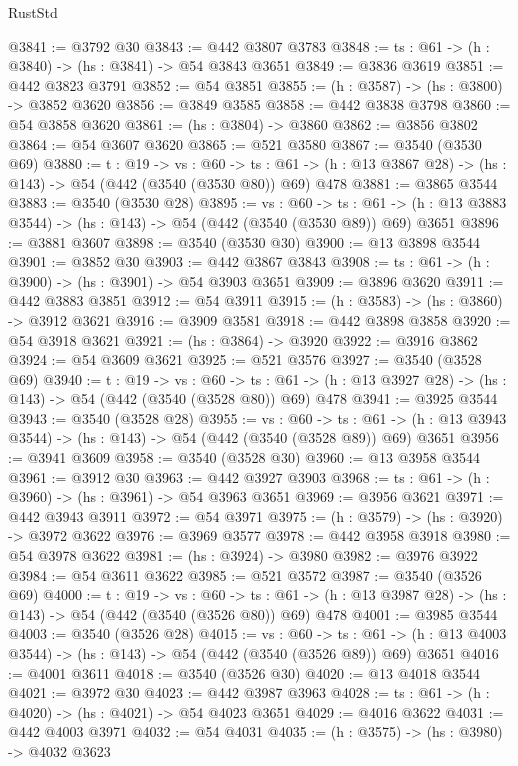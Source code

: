 \begin{lexlean}{RustStd}
\begin{coremodule}
@3841 := @3792 @30
@3843 := @442 @3807 @3783
@3848 := {ts : @61} -> (h : @3840) -> (hs : @3841) -> @54 @3843 @3651
@3849 := @3836 @3619
@3851 := @442 @3823 @3791
@3852 := @54 @3851
@3855 := (h : @3587) -> (hs : @3800) -> @3852 @3620
@3856 := @3849 @3585
@3858 := @442 @3838 @3798
@3860 := @54 @3858 @3620
@3861 := (hs : @3804) -> @3860
@3862 := @3856 @3802
@3864 := @54 @3607 @3620
@3865 := @521 @3580
@3867 := @3540 (@3530 @69)
@3880 := {t : @19} ->
  {vs : @60} ->
  {ts : @61} -> (h : @13 @3867 @28) -> (hs : @143) -> @54 (@442 (@3540 (@3530 @80)) @69) @478
@3881 := @3865 @3544
@3883 := @3540 (@3530 @28)
@3895 := {vs : @60} ->
  {ts : @61} -> (h : @13 @3883 @3544) -> (hs : @143) -> @54 (@442 (@3540 (@3530 @89)) @69) @3651
@3896 := @3881 @3607
@3898 := @3540 (@3530 @30)
@3900 := @13 @3898 @3544
@3901 := @3852 @30
@3903 := @442 @3867 @3843
@3908 := {ts : @61} -> (h : @3900) -> (hs : @3901) -> @54 @3903 @3651
@3909 := @3896 @3620
@3911 := @442 @3883 @3851
@3912 := @54 @3911
@3915 := (h : @3583) -> (hs : @3860) -> @3912 @3621
@3916 := @3909 @3581
@3918 := @442 @3898 @3858
@3920 := @54 @3918 @3621
@3921 := (hs : @3864) -> @3920
@3922 := @3916 @3862
@3924 := @54 @3609 @3621
@3925 := @521 @3576
@3927 := @3540 (@3528 @69)
@3940 := {t : @19} ->
  {vs : @60} ->
  {ts : @61} -> (h : @13 @3927 @28) -> (hs : @143) -> @54 (@442 (@3540 (@3528 @80)) @69) @478
@3941 := @3925 @3544
@3943 := @3540 (@3528 @28)
@3955 := {vs : @60} ->
  {ts : @61} -> (h : @13 @3943 @3544) -> (hs : @143) -> @54 (@442 (@3540 (@3528 @89)) @69) @3651
@3956 := @3941 @3609
@3958 := @3540 (@3528 @30)
@3960 := @13 @3958 @3544
@3961 := @3912 @30
@3963 := @442 @3927 @3903
@3968 := {ts : @61} -> (h : @3960) -> (hs : @3961) -> @54 @3963 @3651
@3969 := @3956 @3621
@3971 := @442 @3943 @3911
@3972 := @54 @3971
@3975 := (h : @3579) -> (hs : @3920) -> @3972 @3622
@3976 := @3969 @3577
@3978 := @442 @3958 @3918
@3980 := @54 @3978 @3622
@3981 := (hs : @3924) -> @3980
@3982 := @3976 @3922
@3984 := @54 @3611 @3622
@3985 := @521 @3572
@3987 := @3540 (@3526 @69)
@4000 := {t : @19} ->
  {vs : @60} ->
  {ts : @61} -> (h : @13 @3987 @28) -> (hs : @143) -> @54 (@442 (@3540 (@3526 @80)) @69) @478
@4001 := @3985 @3544
@4003 := @3540 (@3526 @28)
@4015 := {vs : @60} ->
  {ts : @61} -> (h : @13 @4003 @3544) -> (hs : @143) -> @54 (@442 (@3540 (@3526 @89)) @69) @3651
@4016 := @4001 @3611
@4018 := @3540 (@3526 @30)
@4020 := @13 @4018 @3544
@4021 := @3972 @30
@4023 := @442 @3987 @3963
@4028 := {ts : @61} -> (h : @4020) -> (hs : @4021) -> @54 @4023 @3651
@4029 := @4016 @3622
@4031 := @442 @4003 @3971
@4032 := @54 @4031
@4035 := (h : @3575) -> (hs : @3980) -> @4032 @3623

\end{coremodule}
\end{lexlean}
